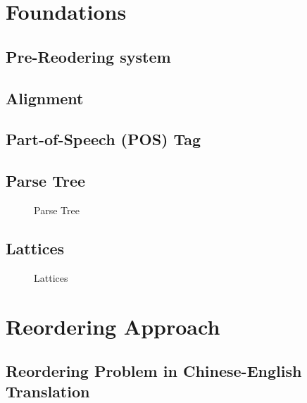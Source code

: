 
\chapter{Foundations}
\label{ch:Foundations}

\section{Pre-Reodering system}
\label{ch:Foundations:sec:PreReorderingSystem}

\section{Alignment}
\label{ch:Foundations:sec:Alignment}

\section{Part-of-Speech (POS) Tag}
\label{ch:Foundations:sec:PosTag}

\section{Parse Tree}
\label{ch:Foundations:sec:ParseTree}

\begin{figure}[H]
\centering

\caption{Parse Tree}
\end{figure}


\section{Lattices}
\label{ch:Foundations:sec:Lattices}

\begin{figure}[H]
\centering

\caption{Lattices}
\end{figure}

\chapter{Reordering Approach}
\label{ch:ReorderingApproach}

\section{Reordering Problem in Chinese-English Translation}
\label{ch:ReorderingApproach:sec:Problem}
